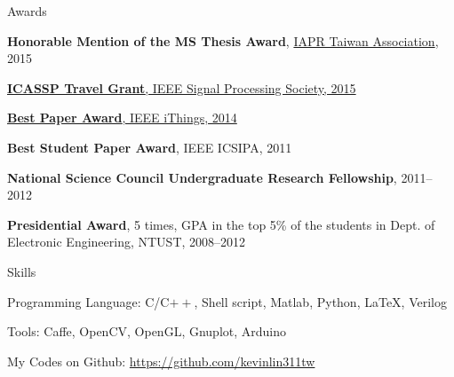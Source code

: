 \documentclass{resume} %
\begin{document}

\begin{rSection}{Awards}

\textbf{Honorable Mention of the MS Thesis Award}, \href{http://www.iapr.org/aboutus/organizations.php}{IAPR Taiwan Association}, 2015


\href{http://www.signalprocessingsociety.org/membership/sps-travel-grants/}{\textbf{ICASSP Travel Grant}, IEEE Signal Processing Society, 2015}

\href{http://ithings2014.org/}{\textbf{Best Paper Award}, IEEE iThings, 2014}


		   		   
\textbf{Best Student Paper Award}, IEEE ICSIPA, 2011

\textbf{National Science Council Undergraduate Research Fellowship}, 2011--2012

\textbf{Presidential Award}, 5 times, GPA in the top 5\% of the students in Dept. of Electronic Engineering, NTUST, 2008--2012
\end{rSection}


\begin{rSection}{Skills}

Programming Language: C/C$++$, Shell script, Matlab, Python, \LaTeX , Verilog

Tools: Caffe, OpenCV, OpenGL, Gnuplot, Arduino

My Codes on Github: \url{https://github.com/kevinlin311tw}

\end{rSection}





\end{document}
